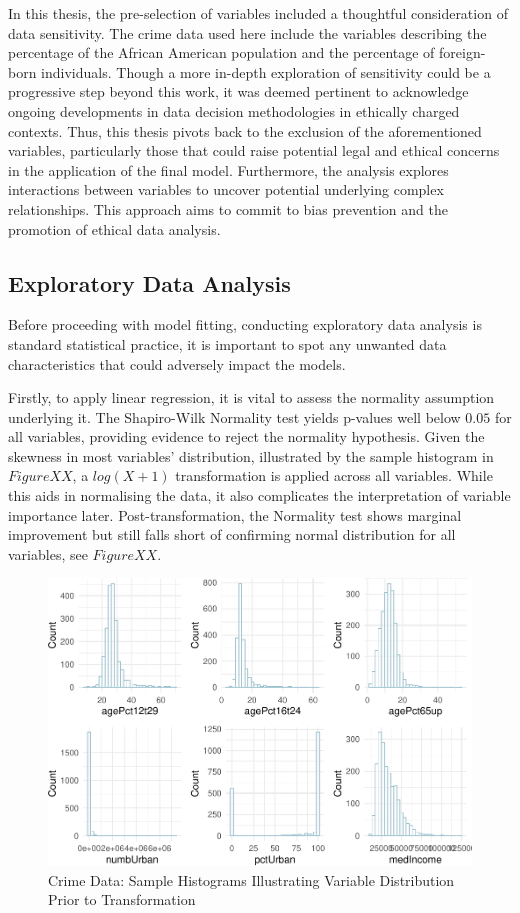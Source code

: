 \documentclass[
  11pt,
]{article}
\begin{document}
In this thesis, the pre-selection of variables included a thoughtful
consideration of data sensitivity. The crime data used here include the
variables describing the percentage of the African American population
and the percentage of foreign-born individuals. Though a more in-depth
exploration of sensitivity could be a progressive step beyond this work,
it was deemed pertinent to acknowledge ongoing developments in data
decision methodologies in ethically charged contexts. Thus, this thesis
pivots back to the exclusion of the aforementioned variables,
particularly those that could raise potential legal and ethical concerns
in the application of the final model. Furthermore, the analysis
explores interactions between variables to uncover potential underlying
complex relationships. This approach aims to commit to bias prevention
and the promotion of ethical data analysis.

\subsection{Exploratory Data Analysis}

Before proceeding with model fitting, conducting exploratory data
analysis is standard statistical practice, it is important to spot any
unwanted data characteristics that could adversely impact the models.

Firstly, to apply linear regression, it is vital to assess the normality
assumption underlying it. The Shapiro-Wilk Normality test yields
p-values well below \(0.05\) for all variables, providing evidence to
reject the normality hypothesis. Given the skewness in most variables'
distribution, illustrated by the sample histogram in \(Figure XX\), a
\(log(X + 1)\) transformation is applied across all variables. While
this aids in normalising the data, it also complicates the
interpretation of variable importance later. Post-transformation, the
Normality test shows marginal improvement but still falls short of
confirming normal distribution for all variables, see \(Figure XX\).

\begin{figure}[H]

{\centering \includegraphics[width=0.85\linewidth]{dissertation_files/figure-latex/Histograms df Plot-1} 

}

\caption{Crime Data: Sample Histograms Illustrating Variable Distribution Prior to Transformation}\label{fig:Histograms df Plot}
\end{figure}
\end{document}
